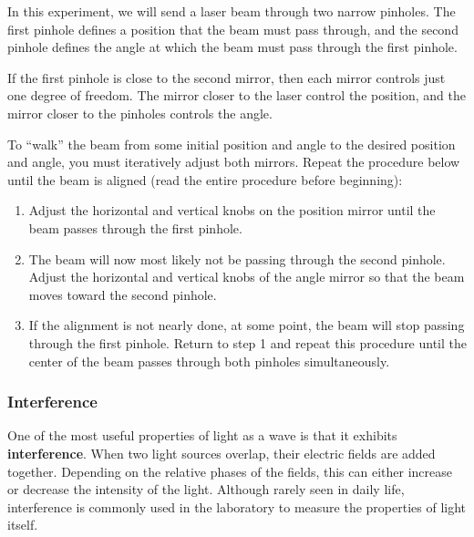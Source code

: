 \documentclass[]{manual}
\begin{document}
    In this experiment, we will send a laser beam through two narrow pinholes.
    The first pinhole defines a position that the beam must pass through, and the second pinhole defines the angle at which the beam must pass through the first pinhole.

    If the first pinhole is close to the second mirror, then each mirror controls just one degree of freedom.
    The mirror closer to the laser control the position, and the mirror closer to the pinholes controls the angle.

    To ``walk'' the beam from some initial position and angle to the desired position and angle, you must iteratively adjust both mirrors.
    Repeat the procedure below until the beam is aligned (read the entire procedure before beginning):

    \begin{enumerate}
        \item Adjust the horizontal and vertical knobs on the position mirror until the beam passes through the first pinhole.
        \item The beam will now most likely not be passing through the second pinhole.
        Adjust the horizontal and vertical knobs of the angle mirror so that the beam moves toward the second pinhole.
        \item If the alignment is not nearly done, at some point, the beam will stop passing through the first pinhole.
        Return to step 1 and repeat this procedure until the center of the beam passes through both pinholes simultaneously.
    \end{enumerate}


    \subsubsection{Interference}

    One of the most useful properties of light as a wave is that it exhibits \textbf{interference}.
    When two light sources overlap, their electric fields are added together.
    Depending on the relative phases of the fields, this can either increase or decrease the intensity of the light.
    Although rarely seen in daily life, interference is commonly used in the laboratory to measure the properties of light itself.
\end{document}
